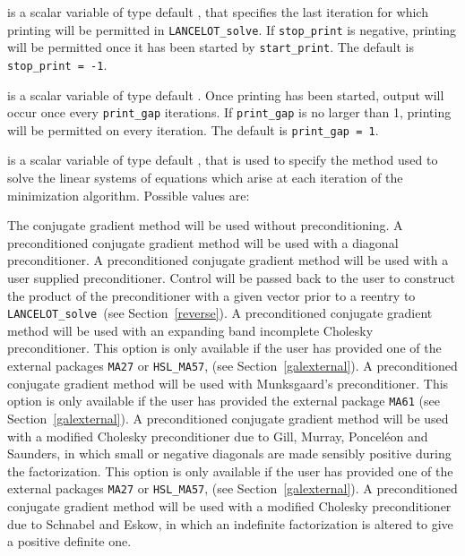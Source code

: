 \documentclass{galahad}
\newcommand{\fullpackagename}{LANC\-E\-LOT}
\newcommand{\solver}{{\tt \fullpackagename\_solve}}
\begin{document}
\begin{description}
 is a scalar variable of type default \integer, that specifies
the last iteration for which printing will be permitted in  \solver.
If {\tt stop\_print} is negative, printing will be permitted once it has been
started by {\tt start\_print}.
The default is {\tt stop\_print = -1}.

 is a scalar variable of type default \integer.
Once printing has been started, output will occur once every
{\tt print\_gap} iterations. If {\tt print\_gap} is no larger than 1,
printing will be permitted on every iteration.
The default is {\tt print\_gap = 1}.

 is a scalar variable of type default \integer, that
is used to specify the method used to solve the linear systems of equations
which arise at each iteration of the minimization algorithm.
 Possible values are:
\begin{description}
    The conjugate gradient method will be used without preconditioning.
    A preconditioned conjugate gradient
    method will be used with a diagonal
    preconditioner.
    A preconditioned conjugate gradient
    method will be used with a user supplied
    preconditioner. Control will be passed back to the user to
    construct the product of the preconditioner with a given
    vector prior to a reentry to \solver\
    (see Section~\ref{reverse}).
    A preconditioned conjugate gradient
    method will be used with an expanding band
    incomplete Cholesky preconditioner.
    This option is only available if the user has provided one of the
    external packages {\tt MA27} or {\tt HSL\_MA57},
    (see Section~\ref{galexternal}).
    A preconditioned conjugate gradient
    method will be used with Munksgaard's
    preconditioner.
    This option is only available if the user has provided the
    external package {\tt MA61}
    (see Section~\ref{galexternal}).
    A preconditioned conjugate gradient
    method will be used with a modified Cholesky
    preconditioner due to Gill, Murray, Poncel\'{e}on and Saunders,
    in which small or negative diagonals are
    made sensibly positive during the factorization.
    This option is only available if the user has provided one of the
    external packages {\tt MA27} or {\tt HSL\_MA57},
    (see Section~\ref{galexternal}).
    A preconditioned conjugate gradient
    method will be used with a modified Cholesky
    preconditioner due to Schnabel and Eskow, in which an indefinite
    factorization is altered to give a positive definite one.

\end{description}
\end{description}
\end{document}
